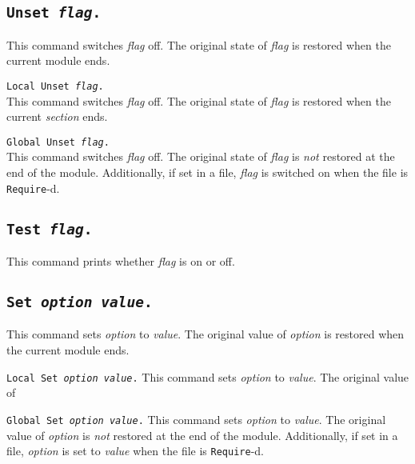 \subsection[\tt Unset {\rm\sl flag}.]{\tt Unset {\rm\sl flag}.}
This command switches {\rm\sl flag} off. The original state of {\rm\sl flag}
is restored when the current module ends.

\begin{Variants}
\item {\tt Local Unset {\rm\sl flag}.}\\
This command switches {\rm\sl flag} off. The original state of {\rm\sl flag}
is restored when the current \emph{section} ends.
\item {\tt Global Unset {\rm\sl flag}.}\\
This command switches {\rm\sl flag} off.  The original state of
{\rm\sl flag} is \emph{not} restored at the end of the module. Additionally,
if set in a file, {\rm\sl flag} is switched on when the file is
{\tt Require}-d.
\end{Variants}

\subsection[\tt Test {\rm\sl flag}.]{\tt Test {\rm\sl flag}.}
This command prints whether {\rm\sl flag} is on or off.

\subsection[\tt Set {\rm\sl option} {\rm\sl value}.]{\tt Set {\rm\sl option} {\rm\sl value}.}
This command sets {\rm\sl option} to {\rm\sl value}. The original value of
{\rm\sl option} is restored when the current module ends.

\begin{Variants}
\item {\tt Local Set {\rm\sl option} {\rm\sl value}.}
This command sets {\rm\sl option} to {\rm\sl value}. The original value of
\item {\tt Global Set {\rm\sl option} {\rm\sl value}.}
This command sets {\rm\sl option} to {\rm\sl value}. The original value of
{\rm\sl option} is \emph{not} restored at the end of the module. Additionally,
if set in a file, {\rm\sl option} is set to {\rm\sl value} when the file is
{\tt Require}-d.
\end{Variants}

